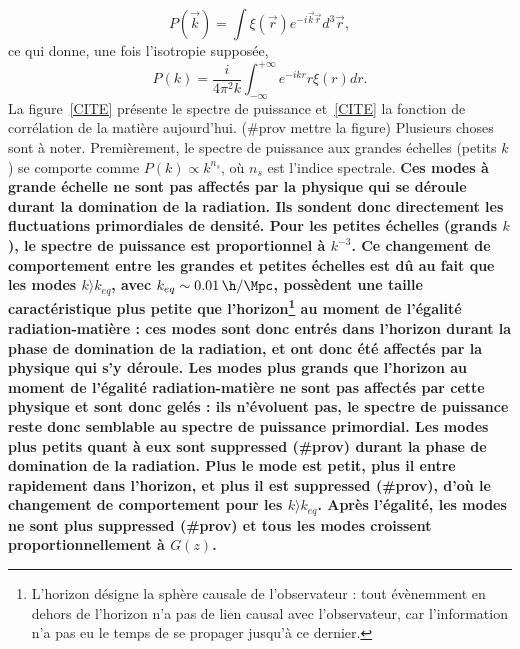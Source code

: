 \documentclass[11pt, twoside, a4paper, openright]{report}
\begin{document}
\begin{equation}
  \label{eq:cf_tf}
  P(\vec{k}) = \int \xi(\vec{r}) e^{- i \vec{k} \vec{r}} d^3\vec{r} ,
\end{equation}
ce qui donne, une fois l'isotropie supposée,
\begin{equation}
  \label{eq:cf_tf2}
  P(k) = \frac{i}{4 \pi^2 k} \int_{-\infty}^{+\infty} e^{- i k r} r \xi(r) dr .
\end{equation}
La figure~\ref{CITE} présente le spectre de puissance et~\ref{CITE} la fonction de corrélation de la matière aujourd'hui. (\#prov mettre la figure)
Plusieurs choses sont à noter. Premièrement, le spectre de puissance aux grandes échelles (petits $k$) se comporte comme $P(k) \propto k^{n_s}$, où $n_s$ est l'indice spectrale.
\textbf{Ces modes à grande échelle ne sont pas affectés par la physique qui se déroule durant la domination de la radiation. Ils sondent donc directement les fluctuations primordiales de densité.
Pour les petites échelles (grands $k$), le spectre de puissance est proportionnel à $k^{-3}$. Ce changement de comportement entre les grandes et petites échelles est dû au fait que les modes $k \rangle k_{eq}$, avec  $k_{eq} \sim \SI{0.01}{\h\per\Mpc}$, possèdent une taille caractéristique plus petite que l'horizon\footnote{L'horizon désigne la sphère causale de l'observateur : tout évènemment en dehors de l'horizon n'a pas de lien causal avec l'observateur, car l'information n'a pas eu le temps de se propager jusqu'à ce dernier.} au moment de l'égalité radiation-matière : ces modes sont donc entrés dans l'horizon durant la phase de domination de la radiation, et ont donc été affectés par la physique qui s'y déroule.
Les modes plus grands que l'horizon au moment de l'égalité radiation-matière ne sont pas affectés par cette physique et sont donc gelés : ils n'évoluent pas, le spectre de puissance reste donc semblable au spectre de puissance primordial.
Les modes plus petits quant à eux sont suppressed (\#prov) durant la phase de domination de la radiation. Plus le mode est petit, plus il entre rapidement dans l'horizon, et plus il est suppressed (\#prov), d'où le changement de comportement pour les $k \rangle k_{eq}$. Après l'égalité, les modes ne sont plus suppressed (\#prov) et tous les modes croissent proportionnellement à $G(z)$. }
\end{document}
